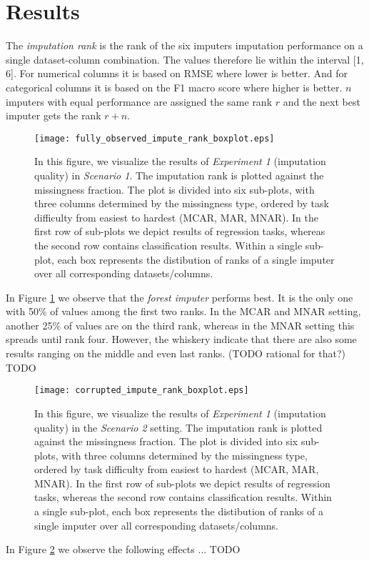\graphicspath{ {figures/} } %


\section{Results}


The \textit{imputation rank} is the rank of the six imputers imputation performance on a single dataset-column combination. The values therefore lie within the interval [1, 6]. For numerical columns it is based on RMSE where lower is better. And for categorical columns it is based on the F1 macro score where higher is better. $n$ imputers with equal performance are assigned the same rank $r$ and the next best imputer gets the rank $r+n$.


\begin{figure}\centering
    \texttt{[image: fully\_observed\_impute\_rank\_boxplot.eps]}
    \caption[Scenario 1 Imputation Ranks]{In this figure, we visualize the results of \textit{Experiment 1} (imputation quality) in \textit{Scenario 1}. The imputation rank is plotted against the missingness fraction. The plot is divided into six sub-plots, with three columns determined by the missingness type, ordered by task difficulty from easiest to hardest (MCAR, MAR, MNAR). In the first row of sub-plots we depict results of regression tasks, whereas the second row contains classification results. Within a single sub-plot, each box represents the distibution of ranks of a single imputer over all corresponding datasets/columns.}\label{fig:fully_observed_impute_rank_boxplot}
\end{figure}

In Figure \ref{fig:fully_observed_impute_rank_boxplot} we observe that the \textit{forest imputer} performs best. It is the only one with 50\% of values among the first two ranks. In the MCAR and MNAR setting, another 25\% of values are on the third rank, whereas in the MNAR setting this spreads until rank four. However, the whiskery indicate that there are also some results ranging on the middle and even last ranks. (TODO rational for that?)
TODO

\begin{figure}\centering
    \texttt{[image: corrupted\_impute\_rank\_boxplot.eps]}
    \caption[Scenario 2 Imputation Ranks]{In this figure, we visualize the results of \textit{Experiment 1} (imputation quality) in the \textit{Scenario 2} setting. The imputation rank is plotted against the missingness fraction. The plot is divided into six sub-plots, with three columns determined by the missingness type, ordered by task difficulty from easiest to hardest (MCAR, MAR, MNAR). In the first row of sub-plots we depict results of regression tasks, whereas the second row contains classification results. Within a single sub-plot, each box represents the distibution of ranks of a single imputer over all corresponding datasets/columns.}\label{fig:corrupted_impute_rank_boxplot}
\end{figure}

In Figure \ref{fig:corrupted_impute_rank_boxplot} we observe the following effects ...
TODO
